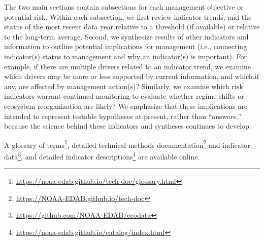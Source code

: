 \documentclass[
  10pt,
]{article}
\begin{document}
The two main sections contain subsections for each management objective or potential risk. Within each subsection, we first review indicator trends, and the status of the most recent data year relative to a threshold (if available) or relative to the long-term average. Second, we synthesize results of other indicators and information to outline potential implications for management (i.e., connecting indicator(s) status to management and why an indicator(s) is important). For example, if there are multiple drivers related to an indicator trend, we examine which drivers may be more or less supported by current information, and which,if any, are affected by management action(s)? Similarly, we examine which risk indicators warrant continued monitoring to evaluate whether regime shifts or ecosystem reorganization are likely? We emphasize that these implications are intended to represent testable hypotheses at present, rather than ``answers,'' because the science behind these indicators and syntheses continues to develop.

A glossary of terms\footnote{\url{https://noaa-edab.github.io/tech-doc/glossary.html}}, detailed technical methods documentation\footnote{\url{https://NOAA-EDAB.github.io/tech-doc}} and indicator data\footnote{\url{https://github.com/NOAA-EDAB/ecodata}}, and detailed indicator descriptions\footnote{\url{https://noaa-edab.github.io/catalog/index.html}} are available online.

\providecommand{\docline}[3]{\noalign{\global\setlength{\arrayrulewidth}{#1}}\arrayrulecolor[HTML]{#2}\cline{#3}}

\setlength{\tabcolsep}{2pt}

\renewcommand*{\arraystretch}{1}
\end{document}
